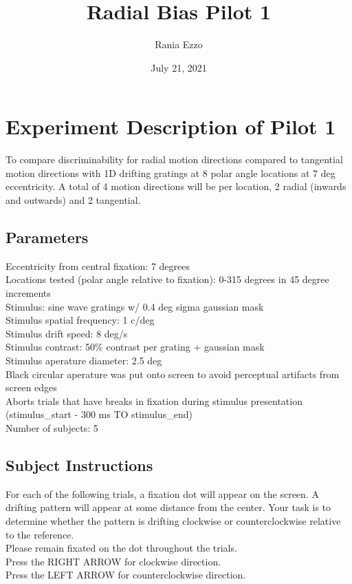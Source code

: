 \documentclass[11pt]{article} %
\title{Radial Bias Pilot 1}
\date{July 21, 2021}
\author{Rania Ezzo}
\begin{document}
\maketitle
\tableofcontents


\section{Experiment Description of Pilot 1}
To compare discriminability for radial motion directions compared to tangential motion directions with 1D drifting gratings at 8 polar angle locations at 7 deg eccentricity. A total of 4 motion directions will be per location, 2 radial (inwards and outwards) and 2 tangential.

\subsection{Parameters}
Eccentricity from central fixation: 7 degrees
\\
Locations tested (polar angle relative to fixation): 0-315 degrees in 45 degree increments
\\
Stimulus: sine wave gratings w/ 0.4 deg sigma gaussian mask
\\
Stimulus spatial frequency: 1 c/deg
\\
Stimulus drift speed: 8 deg/s
\\
Stimulus contrast: 50\% contrast per grating + gaussian mask
\\
Stimulus aperature diameter: 2.5 deg
\\
Black circular aperature was put onto screen to avoid perceptual artifacts from screen edges
\\
Aborts trials that have breaks in fixation during stimulus presentation (stimulus\_start - 300 ms TO stimulus\_end)
\\
Number of subjects: 5

\subsection{Subject Instructions}
For each of the following trials, a fixation dot will appear on the screen. A drifting pattern will appear at some distance from the center. Your task is to determine whether the pattern is drifting clockwise or counterclockwise relative to the reference.
\\
Please remain fixated on the dot throughout the trials.
\\
Press the RIGHT ARROW for clockwise direction.
\\
Press the LEFT ARROW for counterclockwise direction.
\end{document}
